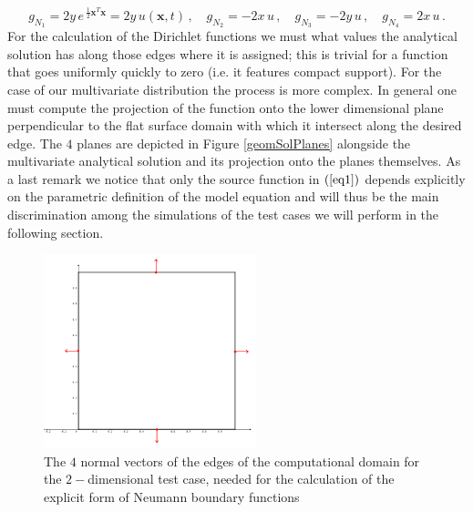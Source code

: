 \documentclass[12pt,openany,twoside,a4paper]{article}
\begin{document}
\begin{equation*}
    g_{N_{1}} = 2y\,e^{\:\frac{1}{2}\mathbf{x}^T\mathbf{x}} = 2y\,u(\mathbf{x},t)\,,\quad
    g_{N_{2}} = -2x\,u\,,\quad
    g_{N_{3}} = -2y\,u\,,\quad
    g_{N_{4}} = 2x\,u\,.
\end{equation*}
For the calculation of the Dirichlet functions we must what values the analytical solution has along those edges where it is assigned; this is trivial for a function that goes uniformly quickly to zero (i.e. it features  compact support). For the case of our multivariate distribution the process is more complex. In general one must compute the projection of the function onto the lower dimensional plane perpendicular to the flat surface domain with which it intersect along the desired edge. The $4$ planes are depicted in Figure \ref{geomSolPlanes} alongside the multivariate analytical solution and its projection onto the planes themselves. As a last remark we notice that only the source function in $(\ref{eq1})$ depends explicitly on the parametric definition of the model equation and will thus be the main discrimination among the simulations of the test cases we will perform in the following section.
\newpage
\begin{figure}[H]
    \centering
    \includegraphics[keepaspectratio, width = 0.55\textwidth]{geomSquare.png}
    \caption{The $4$ normal vectors of the edges of the computational domain for the $2-$dimensional test case, needed for the calculation of the explicit form of Neumann boundary functions}
        \label{geomSquare}
\end{figure}
\end{document}
